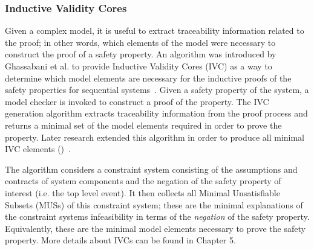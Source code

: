 \subsubsection{Inductive Validity Cores} Given a complex model, it is useful to extract traceability information related to the proof; in other words, which elements of the model were necessary to construct the proof of a safety property. An algorithm was introduced by Ghassabani et al. to provide Inductive Validity Cores (IVC) as a way to determine which model elements are necessary for the inductive proofs of the safety properties for sequential systems~\cite{GhassabaniGW16}. Given a safety property of the system, a model checker is invoked to construct a proof of the property. The IVC generation algorithm extracts traceability information from the proof process and returns a minimal set of the model elements required in order to prove the property. Later research extended this algorithm in order to produce all minimal IVC elements (\aivcalg)~\cite{Ghassabani2017EfficientGO,bendik2018online}. 

The \aivcalg algorithm considers a constraint system consisting of the assumptions and contracts of system components and the negation of the safety property of interest (i.e. the top level event). It then collects all Minimal Unsatisfiable Subsets (MUSs) of this constraint system; these are the minimal explanations of the constraint systems infeasibility in terms of the \textit{negation} of the safety property. Equivalently, these are the minimal model elements necessary to prove the safety property. More details about IVCs can be found in Chapter 5.

 

